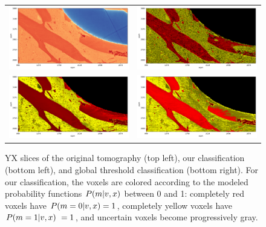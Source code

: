 \begin{figure}
    \centering
    \begin{tabular}{cc}
        \includegraphics[width=.45\linewidth]{generated/770c_pag_segmented_yx_raw.pdf} &
        \includegraphics[width=.45\linewidth]{generated/770c_pag_global_yx_otsu.pdf}
        \\
        \includegraphics[width=.45\linewidth]{generated/770c_pag_segmented_yx_colored.pdf} &
        \includegraphics[width=.45\linewidth]{generated/770c_pag_global_yx.pdf} \\
    \end{tabular}
    \caption{
        YX slices of the original tomography (top left), our classification
        (bottom left), and global threshold classification (bottom right). For
        our classification, the voxels are colored according to the modeled
        probability functions $P(m\vert v,x)$ between 0 and 1: completely
        red voxels have $P(m=0\vert v,x) = 1$, completely yellow voxels
        have $P(m=1\vert v,x)\ = 1$, and uncertain voxels become
        progressively gray.
    }
    \label{fig:histology-comparison1}
\end{figure}

